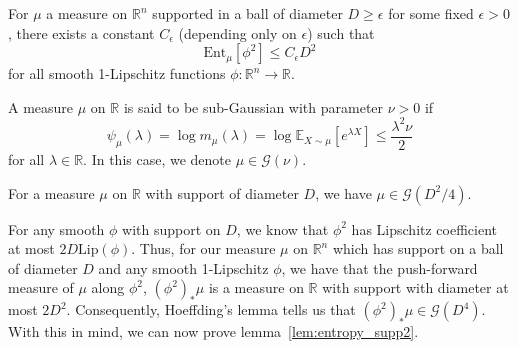 
\begin{lemma}\label{lem:entropy_supp2}
  For \(\mu\) a measure on \(\mathbb{R}^n\) supported in a ball of diameter \(D \ge \epsilon\) for some fixed \(\epsilon > 0\), 
  there exists a constant \(C_\epsilon\) (depending only on \(\epsilon\)) such that 
  \[\text{Ent}_\mu[\phi^2] \le C_\epsilon D^2\]
  for all smooth 1-Lipschitz functions \(\phi : \mathbb{R}^n \to \mathbb{R}\).
\end{lemma}

\begin{definition}
  A measure \(\mu\) on \(\mathbb{R}\) is said to be sub-Gaussian with parameter \(\nu > 0\) if 
  \[\psi_\mu(\lambda) = \log m_{\mu}(\lambda) = \log \mathbb{E}_{X \sim \mu}[e^{\lambda X}] \le \frac{\lambda^2\nu}{2}\]
  for all \(\lambda \in \mathbb{R}\). In this case, we denote \(\mu \in \mathcal{G}(\nu)\).
\end{definition}

\begin{lemma}
  For a measure \(\mu\) on \(\mathbb{R}\) with support of diameter \(D\), we have \(\mu \in \mathcal{G}(D^2 / 4)\).
\end{lemma}

For any smooth \(\phi\) with support on \(D\), we know that \(\phi^2\) has Lipschitz coefficient 
at most \(2D \text{Lip}(\phi)\). Thus, for our measure \(\mu\) on \(\mathbb{R}^n\) which has support on a ball of diameter \(D\) 
and any smooth 1-Lipschitz \(\phi\), we have that the push-forward measure of \(\mu\) along \(\phi^2\), 
\((\phi^2)_* \mu\) is a measure on \(\mathbb{R}\) with support 
with diameter at most \(2D^2\). Consequently, Hoeffding's lemma tells us that \((\phi^2)_* \mu \in \mathcal{G}(D^4)\).  
With this in mind, we can now prove lemma~\ref{lem:entropy_supp2}.

